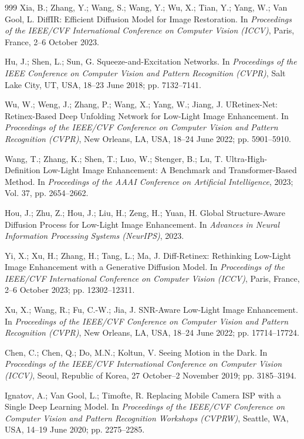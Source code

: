 \documentclass[remotesensing,article,accept,moreauthors]{Definitions/mdpi}
\begin{document}
\begin{thebibliography}{999}
Xia, B.; Zhang, Y.; Wang, S.; Wang, Y.; Wu, X.; Tian, Y.; Yang, W.; Van Gool, L. DiffIR: Efficient Diffusion Model for Image Restoration. In \emph{Proceedings of the IEEE/CVF International Conference on Computer Vision (ICCV)}, Paris, France, 2--6 October 2023.

Hu, J.; Shen, L.; Sun, G. Squeeze-and-Excitation Networks. In \emph{Proceedings of the IEEE Conference on Computer Vision and Pattern Recognition (CVPR)}, Salt Lake City, UT, USA, 18--23 June 2018; pp. 7132--7141.

Wu, W.; Weng, J.; Zhang, P.; Wang, X.; Yang, W.; Jiang, J. URetinex-Net: Retinex-Based Deep Unfolding Network for Low-Light Image Enhancement. In \emph{Proceedings of the IEEE/CVF Conference on Computer Vision and Pattern Recognition (CVPR)}, New Orleans, LA, USA, 18--24 June 2022; pp. 5901--5910.

Wang, T.; Zhang, K.; Shen, T.; Luo, W.; Stenger, B.; Lu, T. Ultra-High-Definition Low-Light Image Enhancement: A Benchmark and Transformer-Based Method. In \emph{Proceedings of the AAAI Conference on Artificial Intelligence}, 2023; Vol. 37, pp. 2654--2662.

Hou, J.; Zhu, Z.; Hou, J.; Liu, H.; Zeng, H.; Yuan, H. Global Structure-Aware Diffusion Process for Low-Light Image Enhancement. In \emph{Advances in Neural Information Processing Systems (NeurIPS)}, 2023.

Yi, X.; Xu, H.; Zhang, H.; Tang, L.; Ma, J. Diff-Retinex: Rethinking Low-Light Image Enhancement with a Generative Diffusion Model. In \emph{Proceedings of the IEEE/CVF International Conference on Computer Vision (ICCV)}, Paris, France, 2--6 October 2023; pp. 12302--12311.

Xu, X.; Wang, R.; Fu, C.-W.; Jia, J. SNR-Aware Low-Light Image Enhancement. In \emph{Proceedings of the IEEE/CVF Conference on Computer Vision and Pattern Recognition (CVPR)}, New Orleans, LA, USA, 18--24 June 2022; pp. 17714--17724.

Chen, C.; Chen, Q.; Do, M.N.; Koltun, V. Seeing Motion in the Dark. In \emph{Proceedings of the IEEE/CVF International Conference on Computer Vision (ICCV)}, Seoul, Republic of Korea, 27 October--2 November 2019; pp. 3185--3194.

Ignatov, A.; Van Gool, L.; Timofte, R. Replacing Mobile Camera ISP with a Single Deep Learning Model. In \emph{Proceedings of the IEEE/CVF Conference on Computer Vision and Pattern Recognition Workshops (CVPRW)}, Seattle, WA, USA, 14--19 June 2020; pp. 2275--2285.

\end{thebibliography}

\PublishersNote{}
\end{document}
